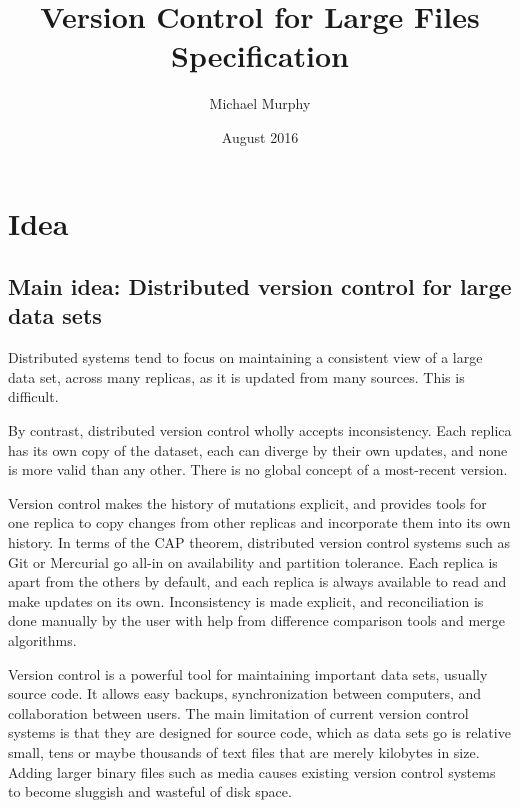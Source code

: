\documentclass[a4paper]{article}
\begin{document}
\title{Version Control for Large Files\\
    Specification}
\author{Michael Murphy}
\date{August 2016}
\maketitle

\section{Idea}\label{idea}

\subsection{Main idea: Distributed version control for large data
sets}\label{main-idea-distributed-version-control-for-large-data-sets}

Distributed systems tend to focus on maintaining a consistent view of a large
data set, across many replicas, as it is updated from many sources.
This is difficult.

By contrast, distributed version control wholly accepts inconsistency.
Each replica has its own copy of the dataset, each can diverge by their own
updates, and none is more valid than any other.
There is no global concept of a most-recent version.

Version control makes the history of mutations explicit, and provides tools for
one replica to copy changes from other replicas and incorporate them into its
own history.
In terms of the CAP theorem, distributed version control systems such as Git or
Mercurial go all-in on availability and partition tolerance.
Each replica is apart from the others by default, and each replica is always
available to read and make updates on its own.
Inconsistency is made explicit, and reconciliation is done manually by the user
with help from difference comparison tools and merge algorithms.

Version control is a powerful tool for maintaining important data sets, usually
source code.
It allows easy backups, synchronization between computers, and collaboration
between users.
The main limitation of current version control systems is that they are designed
for source code, which as data sets go is relative small, tens or maybe
thousands of text files that are merely kilobytes in size.
Adding larger binary files such as media causes existing version control systems
to become sluggish and wasteful of disk space.
\end{document}
